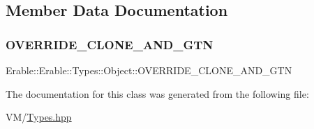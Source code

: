 \subsection{Member Data Documentation}
\mbox{\label{class_erable_1_1_erable_1_1_types_1_1_object_a10aa875c72a24a0cce80136f6b20dc36}} 
\subsubsection{\texorpdfstring{OVERRIDE\_CLONE\_AND\_GTN}{OVERRIDE\_CLONE\_AND\_GTN}}
{\footnotesize\ttfamily Erable\+::\+Erable\+::\+Types\+::\+Object\+::\+O\+V\+E\+R\+R\+I\+D\+E\+\_\+\+C\+L\+O\+N\+E\+\_\+\+A\+N\+D\+\_\+\+G\+TN}



The documentation for this class was generated from the following file\+:\begin{DoxyCompactItemize}
\item 
V\+M/\mbox{\hyperlink{_types_8hpp}{Types.\+hpp}}\end{DoxyCompactItemize}

